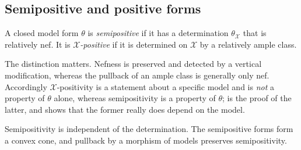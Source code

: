 \subsection{Semipositive and positive forms}
\label{sec:ch20-semipositive-def}

\begin{definition}
\label{def:ch20-semipositive}
A closed model form $\theta$ is \emph{semipositive} if it has a
determination $\theta_{\mathcal X}$ that is relatively nef.  It is
\emph{$\mathcal X$-positive} if it is determined on $\mathcal X$ by a
relatively ample class.
\end{definition}

The distinction matters.  Nefness is preserved and detected by a vertical
modification, whereas the pullback of an ample class is generally only nef.
Accordingly $\mathcal X$-positivity is a statement about a specific model
and is \emph{not} a property of $\theta$ alone, whereas semipositivity is
a property of $\theta$;  is the
proof of the latter, and  shows that the former
really does depend on the model.

\begin{proposition}\label{prop:ch20-semipositive-well-defined}
Semipositivity is independent of the determination.  The semipositive forms
form a convex cone, and pullback by a morphism of models preserves
semipositivity.
\end{proposition}

